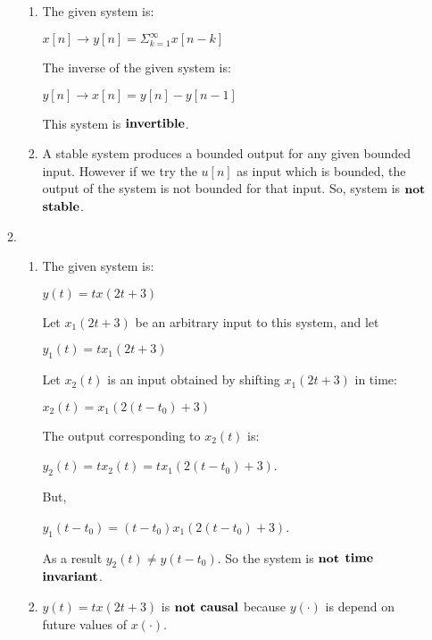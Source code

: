 \documentclass[10pt,a4paper, margin=1in]{article}
\begin{document}
\begin{enumerate}
\begin{enumerate}
\begin{enumerate}
        \item
        The given system is:
        \begin{center}
            $x[n] \longrightarrow y[n] = \Sigma^{\infty}_{k=1} x[n-k]$
        \end{center}
        The inverse of the given system is:
        \begin{center}
            $y[n] \longrightarrow x[n] = y[n]-y[n-1]$
        \end{center}
        This system is $\bold{invertible}$.
        
        \item
        A stable system produces a bounded output for any given bounded input. However if we try the $u[n]$ as input which is bounded, the output of the system is not bounded for that input. So, system is $\bold{not}$ $\bold{stable}$. 
        
        
    \end{enumerate}
    
    \item %
    \begin{enumerate}
        \item 
        The given system is:
        \begin{center}
            $y(t)=tx(2t+3)$
        \end{center}
        Let $x_1(2t+3)$ be an arbitrary input to this system, and let 
        \begin{center}
            $y_1(t) = tx_1(2t+3)$
        \end{center}
        Let $x_2(t)$ is an input obtained by shifting $x_1(2t+3) $ in time:
        \begin{center}
            $x_2(t) = x_1(2(t-t_0)+3)$
       \end{center}
       The output corresponding to $x_2(t)$ is:
       \begin{center}
           $y_2(t) = tx_2(t) = tx_1(2(t-t_0)+3)$.
       \end{center}
       But,
       \begin{center}
            $y_1(t-t_0) = (t-t_0)x_1(2(t-t_0)+3)$.    
       \end{center}
       As a result $y_2(t) \boldsymbol{\neq} y(t-t_0)$. So the system is $\bold{not}$ $\bold{time}$ $\bold{invariant}$.
       
        \item
        $y(t)=tx(2t+3)$ is $\bold{not}$  $\bold{causal}$  because $y(\cdot)$ is depend on future values of $x(\cdot)$.
        

\end{enumerate}
\end{enumerate}
\end{enumerate}
\end{document}

